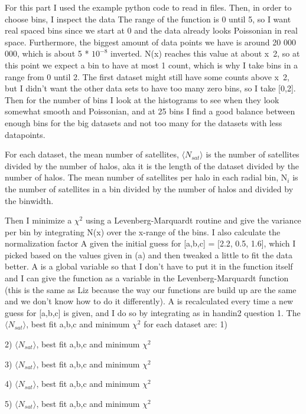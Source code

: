 For this part I used the example python code to read in files. Then, in order to choose bins, I inspect the data
The range of the function is 0 until 5, so I want real spaced bins since we start at 0 and the data already looks
Poissonian in real space. Furthermore, the biggest amount of data points we have is around 20 000 000, which is about 
5 * $10^{-8}$ inverted. N(x) reaches this value at about x~2, so at this point we expect a bin to have at most 1 count,
which is why I take bins in a range from 0 until 2. The first dataset might still have some counts above x~2, but
I didn't want the other data sets to have too many zero bins, so I take [0,2].
Then for the number of bins I look at the histograms to see when they look somewhat smooth and Poissonian, and at 
25 bins I find a good balance between enough bins for the big datasets and not too many for the datasets with less
datapoints.

For each dataset, the mean number of satellites, $\langle N_{sat} \rangle$ is the number of satellites divided by
the number of halos, aka it is the length of the dataset divided by the number of halos. 
The mean number of satellites per halo in each radial bin, N$_i$ is the number of satellites in a bin divided by
the number of halos and divided by the binwidth. 

Then I minimize a $\chi^2$ using a Levenberg-Marquardt routine and give the variance per bin by integrating N(x) 
over the x-range of the bins. I also calculate the normalization factor A given the initial guess for [a,b,c] =
[2.2, 0.5, 1.6], which I picked based on the values given in (a) and then tweaked a little to fit the data better.
A is a global variable so that I don't have to put it in the function itself and I can give the function as a variable
in the Levenberg-Marquardt function (this is the same as Liz because the way our functions are build up are the same and we don't know how to do it differently). A is recalculated every time a new guess for [a,b,c] is given, and I do so
by integrating as in handin2 question 1. 
The $\langle N_{sat} \rangle$, best fit a,b,c and minimum $\chi^2$ for each dataset are: 
1)

2) $\langle N_{sat} \rangle$, best fit a,b,c and minimum $\chi^2$

3) $\langle N_{sat} \rangle$, best fit a,b,c and minimum $\chi^2$

4) $\langle N_{sat} \rangle$, best fit a,b,c and minimum $\chi^2$

5) $\langle N_{sat} \rangle$, best fit a,b,c and minimum $\chi^2$



